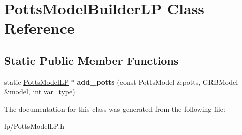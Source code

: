 \hypertarget{classPottsModelBuilderLP}{
\section{PottsModelBuilderLP Class Reference}
\label{classPottsModelBuilderLP}
}
\subsection*{Static Public Member Functions}
\begin{DoxyCompactItemize}
\item 
\hypertarget{classPottsModelBuilderLP_af62f78dc2bdeb5b4d39444c47f8ad341}{
static \hyperlink{structPottsModelLP}{PottsModelLP} $\ast$ {\bfseries add\_\-potts} (const PottsModel \&potts, GRBModel \&model, int var\_\-type)}
\label{classPottsModelBuilderLP_af62f78dc2bdeb5b4d39444c47f8ad341}

\end{DoxyCompactItemize}


The documentation for this class was generated from the following file:\begin{DoxyCompactItemize}
\item 
lp/PottsModelLP.h\end{DoxyCompactItemize}
